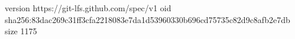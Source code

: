 version https://git-lfs.github.com/spec/v1
oid sha256:83dac269c31ff3cfa2218083e7da1d53960330b696cd75735c82d9c8afb2e7db
size 1175
